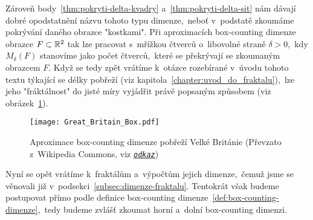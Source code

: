 Zároveň body~\ref{thm:pokryti-delta-kvadry} a~\ref{thm:pokryti-delta-sit} nám dávají dobré opodstatnění názvu tohoto typu dimenze,~neboť v~podstatě zkoumáme pokrývání daného obrazce "kostkami". Při aproximacích box-counting dimenze obrazce $F\subset\mathbb{R}^2$ tak lze pracovat s~mřížkou čtverců o~libovolné straně $\delta>0$,~kdy $M_\delta(F)$ stanovíme jako počet čtverců,~které se překrývají se zkoumaným obrazcem $F$. Když se tedy zpět vrátíme k~otázce rozebírané v~úvodu tohoto textu týkající se délky pobřeží (viz kapitola~\ref{chapter:uvod_do_fraktalu}),~lze jeho "fráktálnost" do jisté míry vyjádřit právě popsaným způsobem (viz obrázek~\ref{fig:aproximace-delky-pobrezi-vb}).
\begin{figure}
    \centering
    \texttt{[image: Great\_Britain\_Box.pdf]}
    \caption[Aproximace box-counting dimenze pobřeží Velké Británie]{Aproximace box-counting dimenze pobřeží Velké Británie (Převzato z~Wikipedia Commons, viz \href{https://en.wikipedia.org/wiki/Minkowski\%E2\%80\%93Bouligand\_dimension}{\texttt{\textit{odkaz}}})}
    \label{fig:aproximace-delky-pobrezi-vb}
\end{figure}
Nyní se opět vrátíme k~fraktálům a~výpočtům jejich dimenze,~čemuž jsme se věnovali již v~podsekci~\ref{subsec:dimenze-fraktalu}. Tentokrát však budeme postupovat přímo podle definice box-counting dimenze~\ref{def:box-counting-dimenze},~tedy budeme zvlášť zkoumat horní a~dolní box-counting dimenzi.

